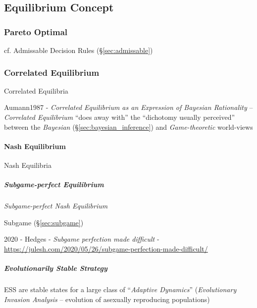 \subsection{Equilibrium Concept}\label{sec:equilibrium_concept}

\subsubsection{Pareto Optimal}\label{sec:pareto_optimal}

\fist cf. Admissable Decision Rules (\S\ref{sec:admissable})



\subsubsection{Correlated Equilibrium}\label{sec:correlated_equilibrium}

Correlated Equilibria

Aumann1987 - \emph{Correlated Equilibrium as an Expression of Bayesian
  Rationality} -- \emph{Correlated Equilibrium} ``does away with'' the
``dichotomy usually perceived'' between the \emph{Bayesian}
(\S\ref{sec:bayesian_inference}) and \emph{Game-theoretic} world-views



\paragraph{Nash Equilibrium}\label{sec:nash_equilibrium}\hfill

Nash Equilibria



\subparagraph{Subgame-perfect Equilibrium}\label{sec:subgame_perfect}\hfill

\emph{Subgame-perfect Nash Equilibrium}

Subgame (\S\ref{sec:subgame})

2020 - Hedges - \emph{Subgame perfection made difficult} -
\url{https://julesh.com/2020/05/26/subgame-perfection-made-difficult/}



\subparagraph{Evolutionarily Stable Strategy}
\label{sec:evolutionarily_stable}\hfill

ESS are stable states for a large class of ``\emph{Adaptive Dynamics}''
(\emph{Evolutionary Invasion Analysis} -- evolution of asexually reproducing
populations)

